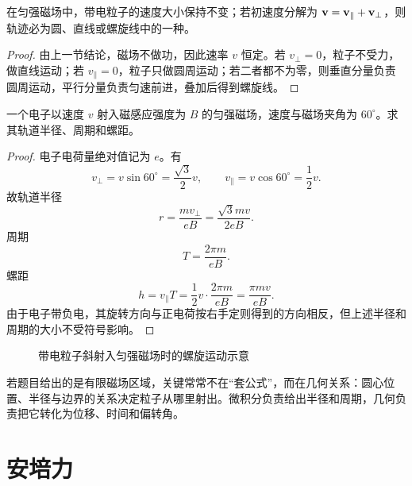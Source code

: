 \begin{theorem}
在匀强磁场中，带电粒子的速度大小保持不变；若初速度分解为 $\vb{v}=\vb{v}_\parallel+\vb{v}_\perp$，则轨迹必为圆、直线或螺旋线中的一种。
\end{theorem}

\begin{proof}
由上一节结论，磁场不做功，因此速率 $v$ 恒定。若 $v_\perp=0$，粒子不受力，做直线运动；若 $v_\parallel=0$，粒子只做圆周运动；若二者都不为零，则垂直分量负责圆周运动，平行分量负责匀速前进，叠加后得到螺旋线。
\end{proof}

\begin{example}
一个电子以速度 $v$ 射入磁感应强度为 $B$ 的匀强磁场，速度与磁场夹角为 $60^\circ$。求其轨道半径、周期和螺距。
\end{example}

\begin{proof}
电子电荷量绝对值记为 $e$。有
\[
  v_\perp=v\sin60^\circ=\frac{\sqrt{3}}{2}v,
  \qquad
  v_\parallel=v\cos60^\circ=\frac{1}{2}v.
\]
故轨道半径
\[
  r=\frac{mv_\perp}{eB}=\frac{\sqrt{3}mv}{2eB}.
\]
周期
\[
  T=\frac{2\pi m}{eB}.
\]
螺距
\[
  h=v_\parallel T=\frac{1}{2}v\cdot\frac{2\pi m}{eB}=\frac{\pi mv}{eB}.
\]
由于电子带负电，其旋转方向与正电荷按右手定则得到的方向相反，但上述半径和周期的大小不受符号影响。
\end{proof}

\begin{figure}[H]
\centering
{}
\caption{带电粒子斜射入匀强磁场时的螺旋运动示意}
\end{figure}

\begin{remark}
若题目给出的是有限磁场区域，关键常常不在“套公式”，而在几何关系：圆心位置、半径与边界的关系决定粒子从哪里射出。微积分负责给出半径和周期，几何负责把它转化为位移、时间和偏转角。
\end{remark}

\section{安培力}

